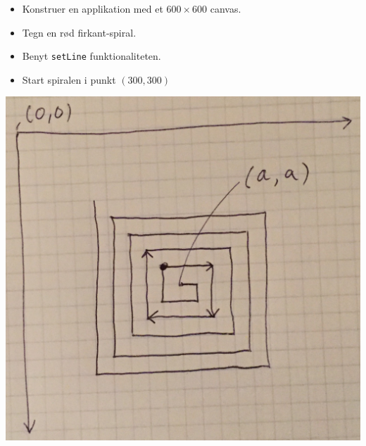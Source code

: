 \documentclass[rgb]{beamer}
\begin{document}
\begin{frame}[fragile]
\begin{footnotesize}

  \vspace{1ex}

  \begin{minipage}[b]{0.55\textwidth}
  \begin{itemize}
  \item Konstruer en applikation med et $600\times600$ canvas.
  \vspace{1ex}

  \item Tegn en rød firkant-spiral.
  \vspace{1ex}

  \item Benyt \lstinline{setLine} funktionaliteten.
  \vspace{1ex}
  \item Start spiralen i punkt $(300,300)$
  \end{itemize}
  \end{minipage}\hfill\begin{minipage}[b]{0.4\textwidth}

  \includegraphics[width=\textwidth]{../images/spiral.jpg}
  \end{minipage}

\end{footnotesize}
\end{frame}
\end{document}
